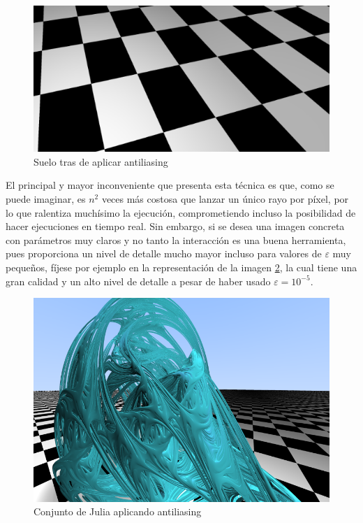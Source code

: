 \begin{figure} [ht]
    \centering
    \includegraphics[scale = 0.5]{img/C8/antiliasing.png}
    \caption{Suelo tras de aplicar antiliasing}
    \label{fig:antiliasing}
\end{figure}

El principal y mayor inconveniente que presenta esta técnica es que, como se puede imaginar, es $n^2$ veces más costosa que lanzar un único rayo por píxel, por lo que ralentiza muchísimo la ejecución, comprometiendo incluso la posibilidad de hacer ejecuciones en tiempo real. Sin embargo, si se desea una imagen concreta con parámetros muy claros y no tanto la interacción es una buena herramienta, pues proporciona un nivel de detalle mucho mayor incluso para valores de $\varepsilon$ muy pequeños, fíjese por ejemplo en la representación de la imagen \ref{fig:julia-antiliasing}, la cual tiene una gran calidad y un alto nivel de detalle a pesar de haber usado $\varepsilon=10^{-5}$.

\begin{figure} [ht]
    \centering
    \includegraphics[scale = 0.4]{img/C8/julia-antiliasing.png}
    \caption{Conjunto de Julia aplicando antiliasing}
    \label{fig:julia-antiliasing}
\end{figure}

